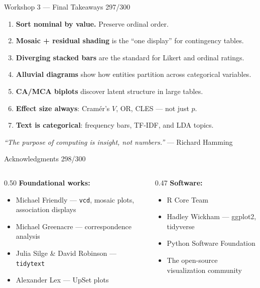 \documentclass[10pt]{beamer}
\newcommand{\smark}[1]{\hfill{\scriptsize\color{codegray}#1}}
\begin{document}
\begin{frame}{Workshop 3 --- Final Takeaways}
\smark{297/300}
\begin{enumerate}
    \item \textbf{Sort nominal by value.} Preserve ordinal order.
    \item \textbf{Mosaic + residual shading} is the ``one display'' for contingency tables.
    \item \textbf{Diverging stacked bars} are the standard for Likert and ordinal ratings.
    \item \textbf{Alluvial diagrams} show how entities partition across categorical variables.
    \item \textbf{CA/MCA biplots} discover latent structure in large tables.
    \item \textbf{Effect size always}: Cram\'er's $V$, OR, CLES --- not just $p$.
    \item \textbf{Text is categorical}: frequency bars, TF-IDF, and LDA topics.
\end{enumerate}

\vspace{0.3cm}
\centering
\textit{``The purpose of computing is insight, not numbers.''} --- Richard Hamming
\end{frame}

\begin{frame}{Acknowledgments}
\smark{298/300}
\begin{columns}[T]
\begin{column}{0.50\textwidth}
    \textbf{Foundational works:}
    \begin{itemize}
        \item Michael Friendly --- \texttt{vcd}, mosaic plots, association displays
        \item Michael Greenacre --- correspondence analysis
        \item Julia Silge \& David Robinson --- \texttt{tidytext}
        \item Alexander Lex --- UpSet plots
    \end{itemize}
\end{column}
\begin{column}{0.47\textwidth}
    \textbf{Software:}
    \begin{itemize}
        \item R Core Team
        \item Hadley Wickham --- ggplot2, tidyverse
        \item Python Software Foundation
        \item The open-source visualization community
    \end{itemize}
\end{column}
\end{columns}
\end{frame}
\end{document}
